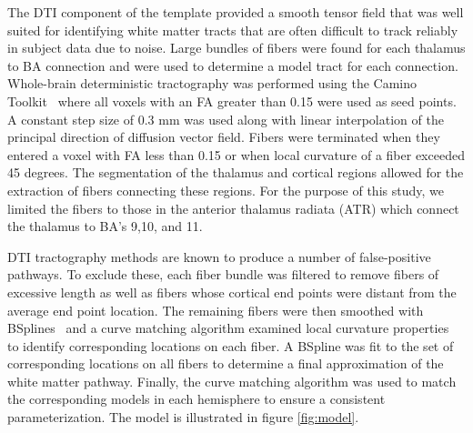 The DTI component of the template provided a smooth tensor field that was well suited for identifying white matter tracts that are often difficult to track reliably in subject data due to noise. Large bundles of fibers were found for each thalamus to BA connection and were used to determine a model tract for each connection. Whole-brain deterministic tractography was performed using the Camino Toolkit~\cite{Cook06} where all voxels with an FA greater than 0.15 were used as seed points. A constant step size of 0.3 mm was used along with linear interpolation of the principal direction of diffusion vector field. Fibers were terminated when they entered a voxel with FA less than 0.15 or when local curvature of a fiber exceeded 45 degrees. The segmentation of the thalamus and cortical regions allowed for the extraction of fibers connecting these regions. For the purpose of this study, we limited the fibers to those in the anterior thalamus radiata (ATR) which connect the thalamus to BA's 9,10, and 11.

DTI tractography methods are known to produce a number of false-positive pathways. To exclude these, each fiber bundle was filtered to remove fibers of excessive length as well as fibers whose cortical end points were distant from the average end point location. The remaining fibers were then smoothed with BSplines~\cite{Tustison06} and a curve matching algorithm examined local curvature properties~\cite{Avants2003b} to identify corresponding locations on each fiber. A BSpline was fit to the set of corresponding locations on all fibers to determine a final approximation of the white matter pathway. Finally, the curve matching algorithm was used to match the corresponding models in each hemisphere to ensure a consistent parameterization. The model is illustrated in figure \ref{fig:model}. 


